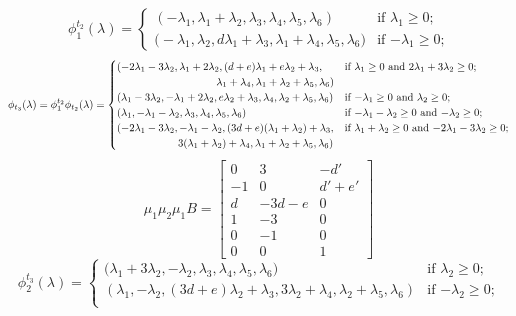 \documentclass{amsart}
\numberwithin{theorem}{section}
\begin{document}
  \[
    \phi^{t_2}_1(\lambda)
    =
    \begin{cases} 
      (-\lambda_1,\lambda_1+\lambda_2,\lambda_3,\lambda_4,\lambda_5,\lambda_6) & \text{if $\lambda_1 \ge 0$;}\\
      \big(-\lambda_1,\lambda_2,d\lambda_1+\lambda_3,\lambda_1+\lambda_4,\lambda_5,\lambda_6\big) & \text{if $-\lambda_1 \ge 0$;}
    \end{cases}
  \]
  \[
    \phi_{t_3}(\lambda)=\phi^{t_2}_1\phi_{t_2}(\lambda)
    =
    \begin{cases} 
      (-2\lambda_1-3\lambda_2,\lambda_1+2\lambda_2,(d+e)\lambda_1+e\lambda_2+\lambda_3, & \text{if $\lambda_1 \ge 0$ and $2\lambda_1+3\lambda_2 \ge 0$;}\\
      \hspace{1.3in} \lambda_1+\lambda_4,\lambda_1+\lambda_2+\lambda_5,\lambda_6) & \\
      (\lambda_1-3\lambda_2,-\lambda_1+2\lambda_2,e\lambda_2+\lambda_3,\lambda_4,\lambda_2+\lambda_5,\lambda_6) & \text{if $-\lambda_1 \ge 0$ and $\lambda_2 \ge 0$;}\\
      (\lambda_1,-\lambda_1-\lambda_2,\lambda_3,\lambda_4,\lambda_5,\lambda_6) & \text{if $-\lambda_1-\lambda_2 \ge 0$ and $-\lambda_2 \ge 0$;}\\
      (-2\lambda_1-3\lambda_2,-\lambda_1-\lambda_2,(3d+e)(\lambda_1+\lambda_2)+\lambda_3, & \text{if $\lambda_1+\lambda_2 \ge 0$ and $-2\lambda_1-3\lambda_2 \ge 0$;}\\
      \hspace{0.8in} 3(\lambda_1+\lambda_2)+\lambda_4,\lambda_1+\lambda_2+\lambda_5,\lambda_6) & \\
    \end{cases}
  \]
  \[
    \mu_1\mu_2\mu_1 B=\left[\begin{array}{ccc} 
    0 & 3 & -d' \\ 
    -1 & 0 & d'+e'\\ 
    d & -3d-e & 0\\ 
    1 & -3 & 0\\ 
    0 & -1 & 0\\ 
    0 & 0 & 1
    \end{array}\right]
  \]
  \[
    \phi^{t_3}_2(\lambda)
    =
    \begin{cases} 
      \big(\lambda_1+3\lambda_2,-\lambda_2,\lambda_3,\lambda_4,\lambda_5,\lambda_6\big) & \text{if $\lambda_2 \ge 0$;}\\
      (\lambda_1,-\lambda_2,(3d+e)\lambda_2+\lambda_3,3\lambda_2+\lambda_4,\lambda_2+\lambda_5,\lambda_6) & \text{if $-\lambda_2 \ge 0$;}\\
    \end{cases}
  \]
\end{document}
